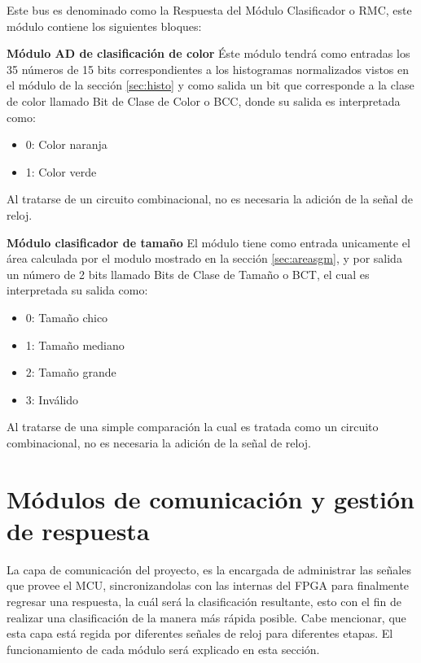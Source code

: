 \documentclass[twoside,spanish,ESP,MSc]{plantillaLabUPV}
\theoremstyle{definition}
\begin{document}
Este bus es denominado como la Respuesta del Módulo Clasificador o RMC, este módulo contiene los siguientes bloques:%


\checkmark\textbf{Módulo AD de clasificación de color} \label{sec:bcc}
Éste módulo tendrá como entradas los 35 números de 15 bits correspondientes a los histogramas normalizados vistos en el módulo de la sección \ref{sec:histo} y como salida un bit que corresponde a la clase de color llamado Bit de Clase de Color o BCC, donde su salida es interpretada como:

\begin{itemize}
	\item 0: Color naranja
	\item 1: Color verde
\end{itemize}

Al tratarse de un circuito combinacional, no es necesaria la adición de la señal de reloj.


\checkmark\textbf{Módulo clasificador de tamaño} \label{sec:bct}
El módulo tiene como entrada unicamente el área calculada por el modulo mostrado en la sección \ref{sec:areasgm}, y  por salida un número de 2 bits llamado Bits de Clase de Tamaño o BCT, el cual es interpretada su salida como:

\begin{itemize}
	\item 0: Tamaño chico
	\item 1: Tamaño mediano
	\item 2: Tamaño grande
	\item 3: Inválido
\end{itemize}

Al tratarse de una simple comparación la cual es tratada como un circuito combinacional, no es necesaria la adición de la señal de reloj.


\section{Módulos de comunicación y gestión de respuesta} \label{sec:comm}
La capa de comunicación del proyecto, es la encargada de administrar las señales que provee el MCU, sincronizandolas con las internas del FPGA para finalmente regresar una respuesta, la cuál será la clasificación resultante, esto con el fin de realizar una clasificación de la manera más rápida posible. Cabe mencionar, que esta capa está regida por diferentes señales de reloj para diferentes etapas. El funcionamiento de cada módulo será explicado en esta sección.
\end{document}
